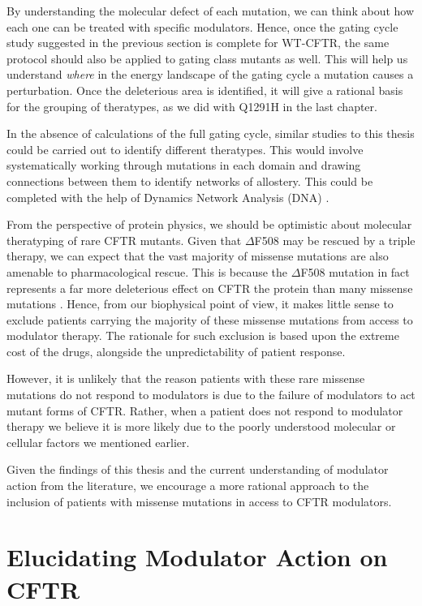 By understanding the molecular defect of each mutation, we can think about how each one can be treated with specific modulators. Hence, once the gating cycle study suggested in the previous section is complete for WT-CFTR, the same protocol should also be applied to gating class mutants as well. This will help us understand \textit{where} in the energy landscape of the gating cycle a mutation causes a perturbation. Once the deleterious area is identified, it will give a rational basis for the grouping of theratypes, as we did with Q1291H in the last chapter.

In the absence of calculations of the full gating cycle, similar studies to this thesis could be carried out to identify different theratypes. This would involve systematically working through mutations in each domain and drawing connections between them to identify networks of allostery. This could be completed with the help of Dynamics Network Analysis (DNA) \cite{melo2020}. 

From the perspective of protein physics, we should be optimistic about molecular theratyping of rare CFTR mutants. Given that $\Delta$F508 may be rescued by a triple therapy, we can expect that the vast majority of missense mutations are also amenable to pharmacological rescue. This is because the $\Delta$F508 mutation in fact represents a far more deleterious effect on CFTR the protein than many missense mutations \cite{bahia2021}. Hence, from our biophysical point of view, it makes little sense to exclude patients carrying the majority of these missense mutations from access to modulator therapy. The rationale for such exclusion is based upon the extreme cost of the drugs, alongside the unpredictability of patient response. 

However, it is unlikely that the reason patients with these rare missense mutations do not respond to modulators is due to the failure of modulators to act mutant forms of CFTR. Rather, when a patient does not respond to modulator therapy we believe it is more likely due to the poorly understood molecular or cellular factors we mentioned earlier. 

Given the findings of this thesis and the current understanding of modulator action from the literature, we encourage a more rational approach to the inclusion of patients with missense mutations in access to CFTR modulators. 


\section{Elucidating Modulator Action on CFTR}


